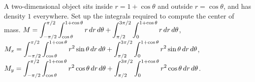 \exercise A two-dimensional object sits inside $r=1+\cos\theta$
and outside $r=\cos\theta$, and has density $1$ everywhere.
Set up
the integrals required to compute the center of mass.
\answer $\displaystyle M= \int_{-\pi/2}^{\pi/2}\int_{\cos\theta}^{1+\cos\theta}
r\,dr\,d\theta + \int_{\pi/2}^{3\pi/2}\int_0^{1+\cos\theta}r\,dr\,d\theta$,
\hfill\break
$\displaystyle M_x=\int_{-\pi/2}^{\pi/2}\int_{\cos\theta}^{1+\cos\theta}
r^2\sin\theta\,dr\,d\theta + \int_{\pi/2}^{3\pi/2}\int_0^{1+\cos\theta}r^2\sin\theta\,dr\,d\theta$,
\hfill\break
$\displaystyle M_y=\int_{-\pi/2}^{\pi/2}\int_{\cos\theta}^{1+\cos\theta}
r^2\cos\theta\,dr\,d\theta + \int_{\pi/2}^{3\pi/2}\int_0^{1+\cos\theta}r^2\cos\theta\,dr\,d\theta$.
\endanswer
\endexercise

\endexercises

